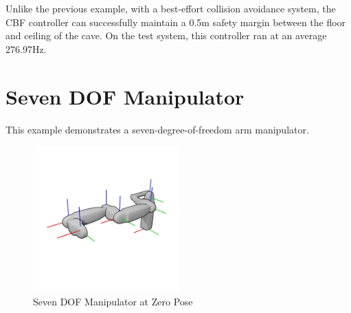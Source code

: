 \noindent Unlike the previous example, with a best-effort collision avoidance system, the CBF controller can successfully maintain a 0.5m safety margin between the floor and ceiling of the cave. On the test system, this controller ran at an average 276.97Hz.

\section{Seven DOF Manipulator}  \label{sec:7dof}

\noindent This example demonstrates a seven-degree-of-freedom arm manipulator.

\begin{figure}[H]
    \centering
    \includegraphics[width=0.5\textwidth]{Figures/Examples/7DOF/Zeroed.png}
    \caption{Seven DOF Manipulator at Zero Pose}
    \label{fig:7dofzero}
\end{figure}

